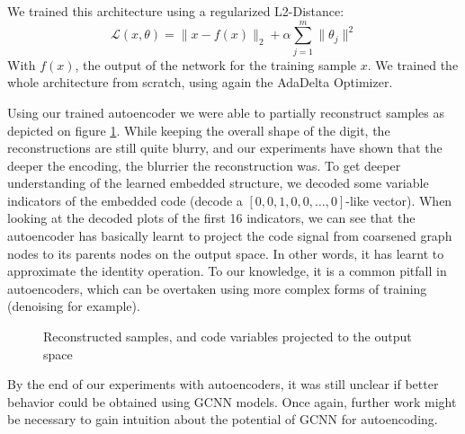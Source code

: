 We trained this architecture using a regularized L2-Distance:
\begin{equation}
    \mathcal{L}(x,\theta) = \|x-f(x)\|_2 + \alpha \sum_{j=1}^m \|\theta_j\|^2
\end{equation}
With $f(x)$, the output of the network for the training sample $x$. We trained the whole architecture from scratch, using again the AdaDelta Optimizer.

Using our trained autoencoder we were able to partially reconstruct samples as depicted on figure \ref{fig:reconstruction}. While keeping the overall shape of the digit, the reconstructions are still quite blurry, and our experiments have shown that the deeper the encoding, the blurrier the reconstruction was. To get deeper understanding of the learned embedded structure, we decoded some variable indicators of the embedded code (decode a $[0,0,1,0,0,\dots,0]$-like vector). When looking at the decoded plots of the first 16 indicators, we can see that the autoencoder has basically learnt to project the code signal from coarsened graph nodes to its parents nodes on the output space. In other words, it has learnt to approximate the identity operation. To our knowledge, it is a common pitfall in autoencoders, which can be overtaken using more complex forms of training (denoising for example). 

\begin{figure}
    \centering
    \caption{Reconstructed samples, and code variables projected to the output space}
    \label{fig:reconstruction}
\end{figure}

By the end of our experiments with autoencoders, it was still unclear if better behavior could be obtained using GCNN models. Once again, further work might be necessary to gain intuition about the potential of GCNN for autoencoding.